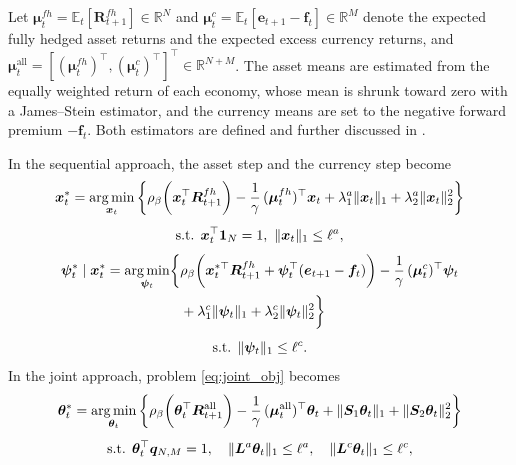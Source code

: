 Let $\bm{\mu}^{fh}_t = \mathbb{E}_t[\bm{R}^{fh}_{t+1}] \in \mathbb{R}^N$ and
$\bm{\mu}^c_t = \mathbb{E}_t[\bm{e}_{t+1} - \bm{f}_t] \in \mathbb{R}^M$ denote the expected fully hedged asset returns and
the expected excess currency returns, and $\bm{\mu}^{\text{all}}_t = [(\bm{\mu}^{fh}_t)^\top, (\bm{\mu}^c_t)^\top]^\top
\in \mathbb{R}^{N+M}$. The asset means are estimated from the equally weighted return of each
economy, whose mean is shrunk toward zero with a James--Stein estimator,
and the currency means are set to the negative forward premium $-\bm{f}_t$. Both estimators are defined and further discussed in
.

In the sequential approach, the asset step and the currency step become
\begin{equation}
\begin{gathered}
    \bm{x}_t^* = \operatorname*{arg\,min}_{\bm{x}_t} \left\{ \rho_\beta\biggl( \bm{x}_t^\top \bm{R}^{fh}_{t+1} \biggr)
    - \frac{1}{\gamma}\, (\bm{\mu}^{fh}_t)^\top \bm{x}_t
    + \lambda_1^a \|\bm{x}_t\|_1 + \lambda_2^a \|\bm{x}_t\|_2^2 \right\} \\[4pt]
    \text{s.t. } \bm{x}_t^\top \bm{1}_N = 1,\ \|\bm{x}_t\|_1 \le \ell^a,
\end{gathered}
\end{equation}
\begin{equation}
\begin{gathered}
    \begin{aligned}
    \bm{\psi}_t^* \mid \bm{x}_t^* = \operatorname*{arg\,min}_{\bm{\psi}_t} \biggl\{ &
    \rho_\beta\biggl( \bm{x}_t^{*\top} \bm{R}^{fh}_{t+1} + \bm{\psi}_t^\top (\bm{e}_{t+1} - \bm{f}_t) \biggr)
    - \frac{1}{\gamma}\, (\bm{\mu}^c_t)^\top \bm{\psi}_t \\
    & + \lambda_1^c \|\bm{\psi}_t\|_1 + \lambda_2^c \|\bm{\psi}_t\|_2^2 \biggr\}
    \end{aligned} \\[4pt]
    \text{s.t. } \|\bm{\psi}_t\|_1 \le \ell^c.
\end{gathered}
\end{equation}
In the joint
approach, problem \eqref{eq:joint_obj} becomes
\begin{equation}
\begin{gathered}
    \bm{\theta}_t^* = \operatorname*{arg\,min}_{\bm{\theta}_t} \left\{ \rho_\beta\biggl( \bm{\theta}_t^\top \bm{R}^{\text{all}}_{t+1} \biggr)
    - \frac{1}{\gamma}\, (\bm{\mu}^{\text{all}}_t)^\top \bm{\theta}_t
    + \|\bm{S}_1 \bm{\theta}_t\|_1 + \|\bm{S}_2 \bm{\theta}_t\|_2^2 \right\} \\[4pt]
    \text{s.t. } \bm{\theta}_t^\top \bm{q}_{N,M} = 1, \quad \|\bm{L}^a \bm{\theta}_t\|_1 \le \ell^a, \quad
    \|\bm{L}^c \bm{\theta}_t\|_1 \le \ell^c,
\end{gathered}
\end{equation}
